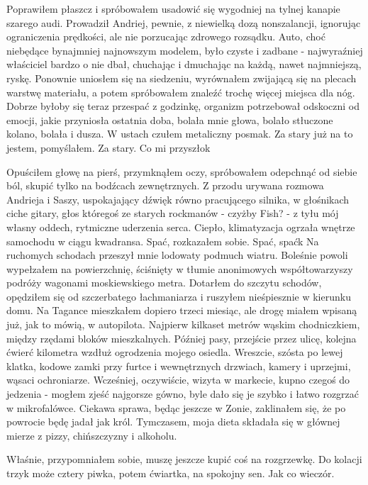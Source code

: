 \documentclass[../MAIN.tex]{subfiles}
\begin{document}
%
Poprawiłem płaszcz i spróbowałem usadowić się wygodniej na
tylnej kanapie szarego audi. Prowadził Andriej, pewnie, z
niewielką dozą nonszalancji, ignorując ograniczenia prędkości,
ale nie porzucając zdrowego rozsądku. Auto, choć niebędące
bynajmniej najnowszym modelem, było czyste i zadbane -
najwyraźniej właściciel bardzo o nie dbał, chuchając i
dmuchając na każdą, nawet najmniejszą, ryskę. Ponownie uniosłem
się na siedzeniu, wyrównałem zwijającą się na plecach warstwę
materiału, a potem spróbowałem znaleźć trochę więcej miejsca
dla nóg. Dobrze byłoby się teraz przespać z godzinkę, organizm
potrzebował odskoczni od emocji, jakie przyniosła ostatnia
doba, bolała mnie głowa, bolało stłuczone kolano, bolała i
dusza. W ustach czułem metaliczny posmak. Za stary już na to
jestem, pomyślałem. Za stary. Co mi przyszło\3k

Opuściłem głowę na pierś, przymknąłem oczy, spróbowałem
odepchnąć od siebie ból, skupić tylko na bodźcach zewnętrznych.
Z przodu urywana rozmowa Andrieja i Saszy, uspokajający dźwięk
równo pracującego silnika, w głośnikach ciche gitary, głos
któregoś ze starych rockmanów - czyżby Fish? - z tyłu mój
własny oddech, rytmiczne uderzenia serca. Ciepło, klimatyzacja
ogrzała wnętrze samochodu w ciągu kwadransa. Spać, rozkazałem
sobie. Spać, spać\3k
%
%
Na ruchomych schodach przeszył mnie lodowaty podmuch wiatru.
Boleśnie powoli wypełzałem na powierzchnię, ściśnięty w tłumie
anonimowych współtowarzyszy podróży wagonami moskiewskiego
metra. Dotarłem do szczytu schodów, opędziłem się od
szczerbatego łachmaniarza i ruszyłem nieśpiesznie w kierunku
domu. Na Tagance mieszkałem dopiero trzeci miesiąc, ale drogę
miałem wpisaną już, jak to mówią, w autopilota. Najpierw
kilkaset metrów wąskim chodniczkiem, między rzędami bloków
mieszkalnych. Później pasy, przejście przez ulicę, kolejna
ćwierć kilometra wzdłuż ogrodzenia mojego osiedla. Wreszcie,
szósta po lewej klatka, kodowe zamki przy furtce i wewnętrznych
drzwiach, kamery i uprzejmi, wąsaci ochroniarze. Wcześniej,
oczywiście, wizyta w markecie, kupno czegoś do jedzenia -
mogłem zjeść najgorsze gówno, byle dało się je szybko i łatwo
rozgrzać w mikrofalówce. Ciekawa sprawa, będąc jeszcze w Zonie,
zaklinałem się, że po powrocie będę jadał jak król. Tymczasem,
moja dieta składała się w głównej mierze z pizzy, chińszczyzny
i alkoholu.

Właśnie, przypomniałem sobie, muszę jeszcze kupić coś na
rozgrzewkę. Do kolacji trzy\3k może cztery piwka, potem
ćwiartka, na spokojny sen. Jak co wieczór.
\end{document}
